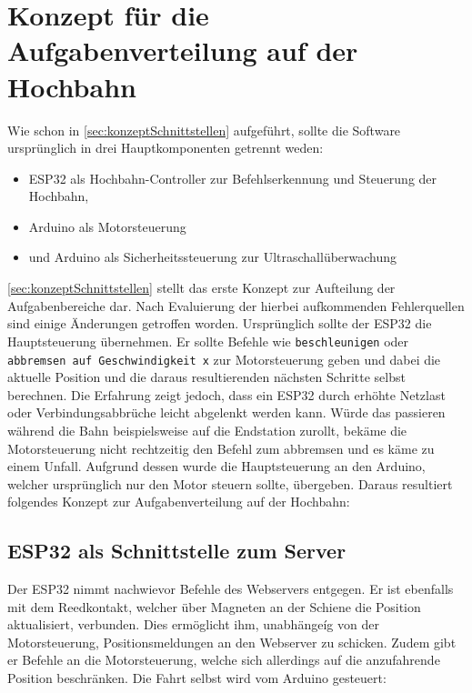 \section{Konzept für die Aufgabenverteilung auf der Hochbahn}
\label{sec:hochbahnAlsClient}
Wie schon in \autoref{sec:konzeptSchnittstellen} aufgeführt, sollte die Software ursprünglich in drei Hauptkomponenten getrennt weden:
\begin{itemize}
	\item ESP32 als Hochbahn-Controller zur Befehlserkennung und Steuerung der Hochbahn,
	\item Arduino als Motorsteuerung
	\item  und Arduino als Sicherheitssteuerung zur Ultraschallüberwachung 
\end{itemize}
\autoref{sec:konzeptSchnittstellen} stellt das erste Konzept zur Aufteilung der Aufgabenbereiche dar. Nach Evaluierung der hierbei aufkommenden Fehlerquellen sind einige Änderungen getroffen worden.
Ursprünglich sollte der ESP32 die Hauptsteuerung übernehmen. Er sollte Befehle wie \texttt{beschleunigen} oder \texttt{abbremsen auf Geschwindigkeit x} zur Motorsteuerung geben und dabei die aktuelle Position und die daraus resultierenden nächsten Schritte selbst berechnen. Die Erfahrung zeigt jedoch, dass ein ESP32 durch erhöhte Netzlast oder Verbindungsabbrüche leicht abgelenkt werden kann. Würde das passieren während die Bahn beispielsweise auf die Endstation zurollt, bekäme die Motorsteuerung nicht rechtzeitig den Befehl zum abbremsen und es käme zu einem Unfall.
Aufgrund dessen wurde die Hauptsteuerung an den Arduino, welcher ursprünglich nur den Motor steuern sollte, übergeben. Daraus resultiert folgendes Konzept zur Aufgabenverteilung auf der Hochbahn:

\subsection{ESP32 als Schnittstelle zum Server}
\label{sec:aufgabeESP}
Der ESP32 nimmt nachwievor Befehle des Webservers entgegen. Er ist ebenfalls mit dem Reedkontakt, welcher über Magneten an der Schiene die Position aktualisiert, verbunden. Dies ermöglicht ihm, unabhängeíg von der Motorsteuerung, Positionsmeldungen an den Webserver zu schicken. Zudem gibt er Befehle an die Motorsteuerung, welche sich allerdings auf die anzufahrende Position beschränken. Die Fahrt selbst wird vom Arduino gesteuert:

